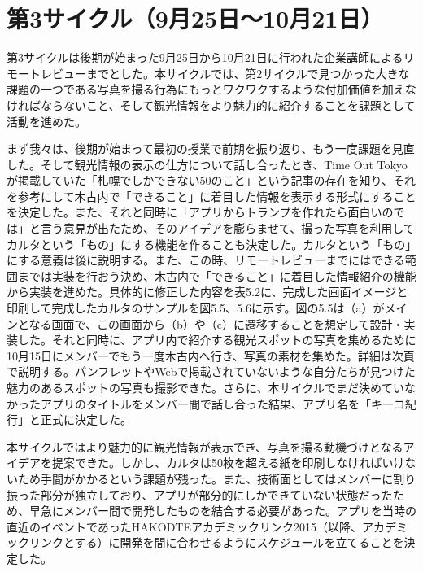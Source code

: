 \section{第3サイクル（9月25日～10月21日）}
第3サイクルは後期が始まった9月25日から10月21日に行われた企業講師によるリモートレビューまでとした。本サイクルでは、第2サイクルで見つかった大きな課題の一つである写真を撮る行為にもっとワクワクするような付加価値を加えなければならないこと、そして観光情報をより魅力的に紹介することを課題として活動を進めた。
\par まず我々は、後期が始まって最初の授業で前期を振り返り、もう一度課題を見直した。そして観光情報の表示の仕方について話し合ったとき、Time Out Tokyoが掲載していた「札幌でしかできない50のこと」という記事の存在を知り、それを参考にして木古内で「できること」に着目した情報を表示する形式にすることを決定した。また、それと同時に「アプリからトランプを作れたら面白いのでは」と言う意見が出たため、そのアイデアを膨らませて、撮った写真を利用してカルタという「もの」にする機能を作ることも決定した。カルタという「もの」にする意義は後に説明する。また、この時、リモートレビューまでにはできる範囲までは実装を行おう決め、木古内で「できること」に着目した情報紹介の機能から実装を進めた。具体的に修正した内容を表5.2に、完成した画面イメージと印刷して完成したカルタのサンプルを図5.5、5.6に示す。図の5.5は（a）がメインとなる画面で、この画面から（b）や（c）に遷移することを想定して設計・実装した。それと同時に、アプリ内で紹介する観光スポットの写真を集めるために10月15日にメンバーでもう一度木古内へ行き、写真の素材を集めた。詳細は次頁で説明する。パンフレットやWebで掲載されていないような自分たちが見つけた魅力のあるスポットの写真も撮影できた。さらに、本サイクルでまだ決めていなかったアプリのタイトルをメンバー間で話し合った結果、アプリ名を「キーコ紀行」と正式に決定した。
\par 本サイクルではより魅力的に観光情報が表示でき、写真を撮る動機づけとなるアイデアを提案できた。しかし、カルタは50枚を超える紙を印刷しなければいけないため手間がかかるという課題が残った。また、技術面としてはメンバーに割り振った部分が独立しており、アプリが部分的にしかできていない状態だったため、早急にメンバー間で開発したものを結合する必要があった。アプリを当時の直近のイベントであったHAKODTEアカデミックリンク2015（以降、アカデミックリンクとする）に開発を間に合わせるようにスケジュールを立てることを決定した。\newpage

